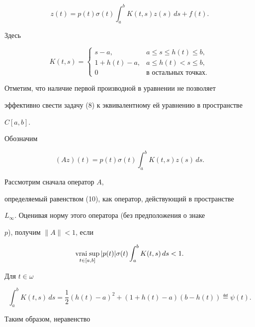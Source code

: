 \begin{exam}
\begin{equation}


z(t)= p(t) \sigma(t)\int_a^b K(t,s) z(s)\,ds + f(t).


\end{equation}


Здесь


$$


K(t,s)=


\begin{cases}


s-a,& a\leq s\leq h(t)\leq b,\\


1+h(t) -a,& a\leq h(t)<s\leq b,\\


0&\text{в остальных точках.}


\end{cases}


$$


Отметим, что наличие первой производной в уравнении не позволяет


эффективно свести задачу (8) к эквивалентному ей уравнению в пространстве


$C[a,b]$.





Обозначим


\begin{equation}


(Az)(t)=p(t) \sigma(t) \int_a^b K(t,s)z(s)\,ds.


\end{equation}


Рассмотрим сначала оператор $A$,


определяемый равенством (10), как оператор, действующий в пространстве


$L_\infty$. Оценивая норму этого оператора (без предположения о знаке


$p$), получим $\|A\|<1$, если


$$


\vraisup_{t\in[a,b]} |p(t)|\sigma(t) \int_a^b K(t,s)\,ds <1.


$$


Для $t\in\omega$


$$


\int_a^b K(t,s)\,ds = \frac{1}{2} (h(t)-a)^2 + (1+h(t)-a)(b-h(t))


\eqdef \psi(t).


$$


Таким образом, неравенство



\end{exam}
